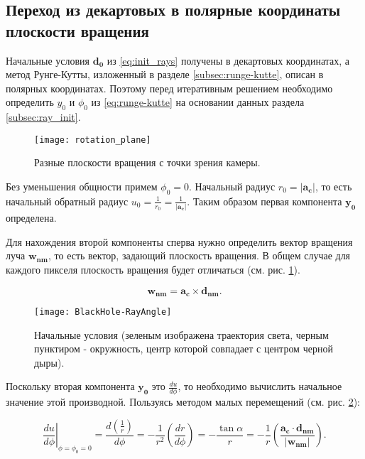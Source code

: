 \subsection{Переход из декартовых в полярные координаты плоскости вращения}
\label{subsec:transition_from_decart_to_polar}

Начальные условия $\mathbf{d_0}$ из \eqref{eq:init_rays} получены в декартовых координатах, а метод Рунге-Кутты, изложенный в разделе \ref{subsec:runge-kutte}, описан в полярных координатах. Поэтому перед итеративным решением необходимо определить $y_0$ и $\phi_0$ из \eqref{eq:runge-kutte} на основании данных раздела \ref{subsec:ray_init}.

\newpage

\begin{figure}[h]
    \centering
    \texttt{[image: rotation\_plane]}
    \caption{Разные плоскости вращения с точки зрения камеры.}
    \label{fig:rotation_plane}
\end{figure}

Без уменьшения общности примем $\phi_0 = 0$. Начальный радиус $r_0 = |\mathbf{a_c}|$, то есть начальный обратный радиус $u_0 = \frac{1}{r_0} = \frac{1}{|\mathbf{a_c}|}$. Таким образом первая компонента $\mathbf{y_0}$ определена.

Для нахождения второй компоненты сперва нужно определить вектор вращения луча $\mathbf{w_{nm}}$, то есть вектор, задающий плоскость вращения. В общем случае для каждого пикселя плоскость вращения будет отличаться (см. рис. \ref{fig:rotation_plane}).

\begin{equation}
\label{eq:w_ray}
    \mathbf{w_{nm}} = \mathbf{a_c} \times \mathbf{d_{nm}}.
\end{equation}

\newpage

\begin{figure}[h]
    \centering
    \texttt{[image: BlackHole-RayAngle]}
    \caption{Начальные условия (зеленым изображена траектория света, черным пунктиром - окружность, центр которой совпадает с центром черной дыры).}
    \label{fig:blackhole_rayAngle}
\end{figure}

Поскольку вторая компонента $\mathbf{y_0}$ это $\frac{du}{d\phi}$, то необходимо вычислить начальное значение этой производной. Пользуясь методом малых перемещений (см. рис. \ref{fig:blackhole_rayAngle}):

\begin{equation}
\label{eq:dudr_init}
    \left.\frac{du}{d\phi}\right|_{\phi=\phi_0=0} = \frac{d\left(\frac{1}{r}\right)}{d\phi} = -\frac{1}{r^2}\left(\frac{dr}{d\phi}\right) = -\frac{\tan{\alpha}}{r} = -\frac{1}{r}\left(\frac{\mathbf{a_c} \cdot \mathbf{d_{nm}}}{\left|\mathbf{w_{nm}}\right|}\right).
\end{equation}

